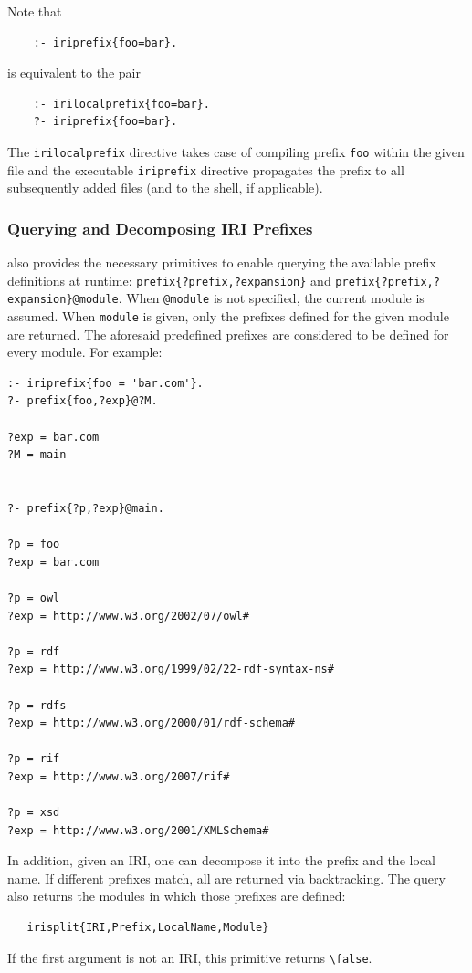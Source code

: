 \documentclass[11pt]{article}
\newcommand{\ERGO}{\mbox{\smaller{\ensuremath{\cal{E}}\smaller{{\sc{RGO}}}}}\xspace}
\newcommand{\FLSYSTEM}{\ERGO}
\newcommand{\bs}{\textbackslash}
\begin{document}
Note that
\begin{verbatim}
    :- iriprefix{foo=bar}.
\end{verbatim}
is equivalent to the pair
\begin{verbatim}
    :- irilocalprefix{foo=bar}.
    ?- iriprefix{foo=bar}.
\end{verbatim}
The \texttt{irilocalprefix} directive  takes case of compiling prefix
\texttt{foo} within the given file and the executable \texttt{iriprefix}   
directive propagates the prefix to all subsequently added files (and to the
\FLSYSTEM shell, if applicable).

\subsubsection{Querying and Decomposing IRI Prefixes}

\FLSYSTEM also provides the necessary primitives to enable querying the
available prefix definitions at runtime:
\texttt{prefix\{?prefix,?expansion\}} and
\texttt{prefix\{?prefix,?expansion\}@module}.
When {\tt @module}  is not
specified, the current module is assumed. When {\tt module} is given,
only the prefixes defined for the given module are returned. The
aforesaid predefined prefixes are considered to be defined for every
module. For example:
\begin{verbatim}
:- iriprefix{foo = 'bar.com'}.
?- prefix{foo,?exp}@?M.

?exp = bar.com
?M = main


?- prefix{?p,?exp}@main.

?p = foo
?exp = bar.com

?p = owl
?exp = http://www.w3.org/2002/07/owl#

?p = rdf
?exp = http://www.w3.org/1999/02/22-rdf-syntax-ns#

?p = rdfs
?exp = http://www.w3.org/2000/01/rdf-schema#

?p = rif
?exp = http://www.w3.org/2007/rif#

?p = xsd
?exp = http://www.w3.org/2001/XMLSchema#
\end{verbatim}

In addition, given an IRI, one can decompose it into the prefix and the
local name. If different prefixes match, all are returned via backtracking.
The query also returns the modules in which those prefixes are defined:
\begin{verbatim}
   irisplit{IRI,Prefix,LocalName,Module}
\end{verbatim}
If the first argument is not an IRI, this primitive returns
\texttt{\bs{}false}.
\end{document}
